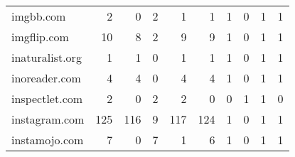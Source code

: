 \begin{tabular}{lrrrrrrrrr}
                  imgbb.com &                                2 &                                  0 &                                      2 &                            1 &                           1 &                                   1 &                                      0 &                             1 &                            1 \\
                imgflip.com &                               10 &                                  8 &                                      2 &                            9 &                           9 &                                   1 &                                      0 &                             1 &                            1 \\
            inaturalist.org &                                1 &                                  1 &                                      0 &                            1 &                           1 &                                   1 &                                      0 &                             1 &                            1 \\
              inoreader.com &                                4 &                                  4 &                                      0 &                            4 &                           4 &                                   1 &                                      0 &                             1 &                            1 \\
             inspectlet.com &                                2 &                                  0 &                                      2 &                            2 &                           0 &                                   0 &                                      1 &                             1 &                            0 \\
              instagram.com &                              125 &                                116 &                                      9 &                          117 &                         124 &                                   1 &                                      0 &                             1 &                            1 \\
              instamojo.com &                                7 &                                  0 &                                      7 &                            1 &                           6 &                                   1 &                                      0 &                             1 &                            1 \\

\end{tabular}
